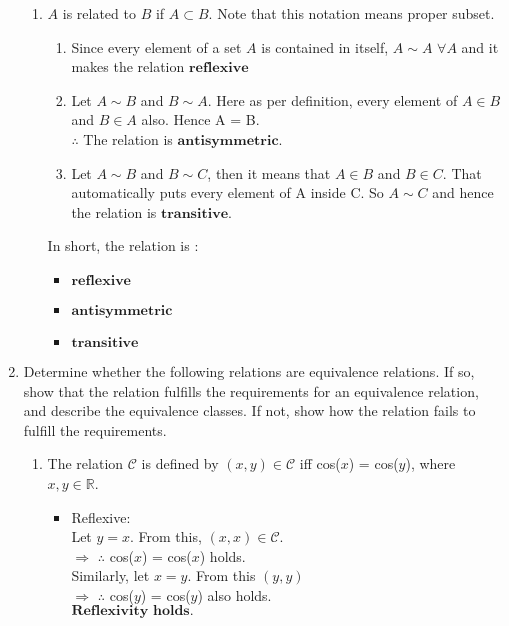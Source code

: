 \documentclass{article}
\newcommand{\R}{\mathbb{R}}
\begin{document}
\begin{enumerate}
\begin{enumerate}
    \item $A$ is related to $B$ if $A \subset B$. Note 
    that this notation means proper subset.
    \begin{enumerate}
        \item Since every element of a set $A$ is contained in itself, $A \sim A$ $\forall A$
        and it makes the relation $\textbf{reflexive}$
        \item Let $A \sim B$ and $B \sim A$. Here as per definition, every element of $A \in B$ 
        and  $B \in A$ also. Hence A = B. \\$\therefore$ The relation is $\textbf{antisymmetric}$.
        \item  Let $A \sim B$ and $B \sim C$, then it means that $A \in B$ and $B \in C$. That automatically puts 
        every element of A inside C. So $A \sim C$ and hence the relation is $\textbf{transitive}$.
    \end{enumerate}
    In short, the relation is :
\begin{itemize}
    \item $\textbf{reflexive}$
    \item $\textbf{antisymmetric}$
    \item $\textbf{transitive}$
\end{itemize}
\end{enumerate}

\pagebreak %

\item Determine whether the following relations are equivalence relations. 
If so, show that the relation fulfills the requirements for an equivalence relation, 
and describe the equivalence classes. If not, show how the relation fails to fulfill 
the requirements.

\begin{enumerate}
    \item The relation $\mathcal{C}$ is defined by $(x,y)\in \mathcal{C}$ iff cos($x$) = cos($y$), 
    where $x,y \in \R$.
    \begin{itemize}
        \item Reflexive:\\ Let $y = x$. From this, $(x,x) \in \mathcal{C}$.\\ 
        $\Rightarrow$ $\therefore$ cos($x$) = cos($x$) holds.\\
        Similarly, let $x = y$. From this $(y,y)$\\ 
        $\Rightarrow$ $\therefore$ cos($y$) = cos($y$) also holds.\\$\textbf{Reflexivity holds.}$\\


\end{itemize}
\end{enumerate}
\end{enumerate}
\end{document}

